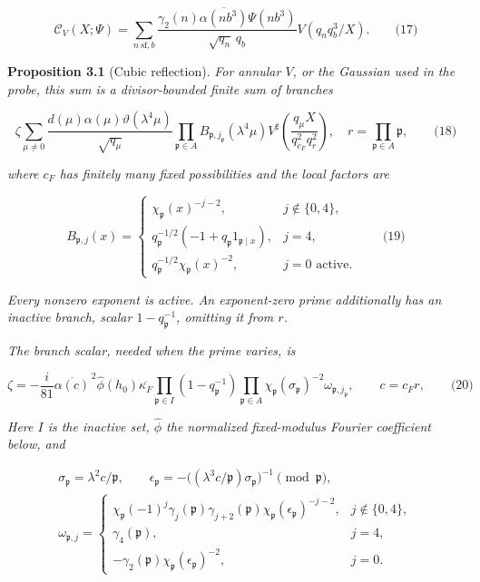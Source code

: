 \hypertarget{cf:eq:B.1}{}

\label{cf:eq:B.1}

\[
\mathcal C_V(X;\Psi)=
\sum_{n\ \mathrm{sf},b}
\frac{\gamma_2(n)\overline{\alpha(nb^3)}\Psi(nb^3)}{\sqrt{q_n}\,q_b}
V(q_nq_b^3/X).
\qquad\text{(17)}
\]

\textbf{Proposition 3.1} (Cubic reflection). \emph{\hypertarget{cf:reflection}{}\label{cf:reflection} For annular \(V\), or the Gaussian used in the probe, this sum is a divisor-bounded finite sum of branches \hypertarget{cf:eq:B.2}{}\label{cf:eq:B.2}}

\[
\zeta\sum_{\mu\ne0}\frac{d(\mu)\alpha(\mu)\vartheta(\lambda^4\mu)}{\sqrt{q_\mu}}
\prod_{\mathfrak p\in A}B_{\mathfrak p,j_{\mathfrak p}}(\lambda^4\mu)
V^\sharp\!\left(\frac{q_\mu X}{q_{c_F}^{2}q_r^{2}}\right),
\quad r=\prod_{\mathfrak p\in A}\mathfrak p,
\qquad\text{(18)}
\]

\emph{where \(c_F\) has finitely many fixed possibilities and the local factors are \hypertarget{cf:eq:B.3}{}\label{cf:eq:B.3}}

\[
B_{\mathfrak p,j}(x)=
\begin{cases}
\chi_{\mathfrak p}(x)^{-j-2},&j\notin\{0,4\},\\
q_{\mathfrak p}^{-1/2}(-1+q_{\mathfrak p}1_{\mathfrak p\mid x}),&j=4,\\
q_{\mathfrak p}^{-1/2}\chi_{\mathfrak p}(x)^{-2},&j=0\text{ active}.
\end{cases}
\qquad\text{(19)}
\]

\emph{Every nonzero exponent is active. An exponent-zero prime additionally has an inactive branch, scalar \(1-q_{\mathfrak p}^{-1}\), omitting it from \(r\).}

\emph{The branch scalar, needed when the prime varies, is \hypertarget{cf:eq:B.4}{}\label{cf:eq:B.4}}

\[
\zeta=-\frac{i}{81}\overline{\alpha(c)}^{\,2}\widehat\phi(h_0)
\overline{\kappa_F}
\prod_{\mathfrak p\in I}(1-q_{\mathfrak p}^{-1})
\prod_{\mathfrak p\in A}\chi_{\mathfrak p}(\sigma_{\mathfrak p})^{-2}
\omega_{\mathfrak p,j_{\mathfrak p}},\qquad c=c_Fr,
\qquad\text{(20)}
\]

\emph{Here \(I\) is the inactive set, \(\widehat\phi\) the normalized fixed-modulus Fourier coefficient below, and}

\[
\begin{gathered}
\sigma_{\mathfrak p}=\lambda^2c/\mathfrak p,\qquad
\epsilon_{\mathfrak p}=-\bigl((\lambda^3c/\mathfrak p)\sigma_{\mathfrak p}\bigr)^{-1}
\pmod{\mathfrak p},\\
\omega_{\mathfrak p,j}=
\begin{cases}
\chi_{\mathfrak p}(-1)^j\gamma_j(\mathfrak p)\gamma_{j+2}(\mathfrak p)
\chi_{\mathfrak p}(\epsilon_{\mathfrak p})^{-j-2},&j\notin\{0,4\},\\
\gamma_4(\mathfrak p),&j=4,\\
-\gamma_2(\mathfrak p)\chi_{\mathfrak p}(\epsilon_{\mathfrak p})^{-2},&j=0.
\end{cases}
\end{gathered}
\]


